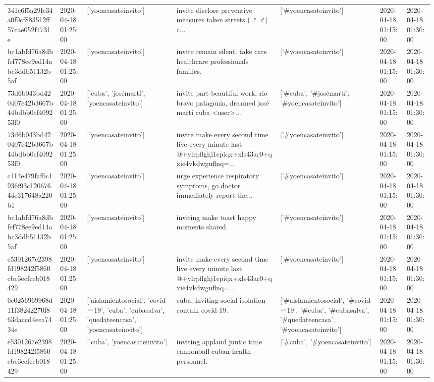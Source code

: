 \begin{tabular}{lllllll}
341c6f5a29fc34a0f0cf883512ff57cae052f4731e & 2020-04-18 01:25:00 & ['yoencasateinvito'] & invite disclose preventive measures taken streets ( ♀️ ♂️) c... & ['#yoencasateinvito'] & 2020-04-18 01:15:00 & 2020-04-18 01:30:00 \\
bc1abfd76a8dbfef778ee9ed14abc3ddb51132b5af & 2020-04-18 01:25:00 & ['yoencasateinvito'] & invite remain silent, take care healthcare professionals families. & ['#yoencasateinvito'] & 2020-04-18 01:15:00 & 2020-04-18 01:30:00 \\
73d6b043bd420407e42b3667b44bdbb0cf409253f0 & 2020-04-18 01:25:00 & ['cuba', 'josémartí', 'yoencasateinvito'] & invite part beautiful work, rio bravo patagonia, dreamed josé martí cuba <user>... & ['#cuba', '#josémartí', '#yoencasateinvito'] & 2020-04-18 01:15:00 & 2020-04-18 01:30:00 \\
73d6b043bd420407e42b3667b44bdbb0cf409253f0 & 2020-04-18 01:25:00 & ['yoencasateinvito'] & invite make every second time live every minute last @+ylrpflghj1epiqx+xls43ar0+qxie4vkdwguflnq=... & ['#yoencasateinvito'] & 2020-04-18 01:15:00 & 2020-04-18 01:30:00 \\
c117e479faf6c1936f93c12067644e317648a220b1 & 2020-04-18 01:25:00 & ['yoencasateinvito'] & urge experience respiratory symptoms, go doctor immediately report the... & ['#yoencasateinvito'] & 2020-04-18 01:15:00 & 2020-04-18 01:30:00 \\
bc1abfd76a8dbfef778ee9ed14abc3ddb51132b5af & 2020-04-18 01:25:00 & ['yoencasateinvito'] & inviting make toast happy moments shared. & ['#yoencasateinvito'] & 2020-04-18 01:15:00 & 2020-04-18 01:30:00 \\
e5301267e2398fd198242f5860cbc3ecfceb018429 & 2020-04-18 01:25:00 & ['yoencasateinvito'] & invite make every second time live every minute last @+ylrpflghj1epiqx+xls43ar0+qxie4vkdwguflnq=... & ['#yoencasateinvito'] & 2020-04-18 01:15:00 & 2020-04-18 01:30:00 \\
6e0256969968d11f38242270f863daccd4eea7434e & 2020-04-18 01:25:00 & ['aislamientosocial', 'covidー19', 'cuba', 'cubasalva', 'quedateencasa', 'yoencasateinvito'] & cuba, inviting social isolation contain covid-19. & ['#aislamientosocial', '#covidー19', '#cuba', '#cubasalva', '#quedateencasa', '#yoencasateinvito'] & 2020-04-18 01:15:00 & 2020-04-18 01:30:00 \\
e5301267e2398fd198242f5860cbc3ecfceb018429 & 2020-04-18 01:25:00 & ['cuba', 'yoencasateinvito'] & inviting applaud juntic time cannonball cuban health personnel. & ['#cuba', '#yoencasateinvito'] & 2020-04-18 01:15:00 & 2020-04-18 01:30:00 \\

\end{tabular}
